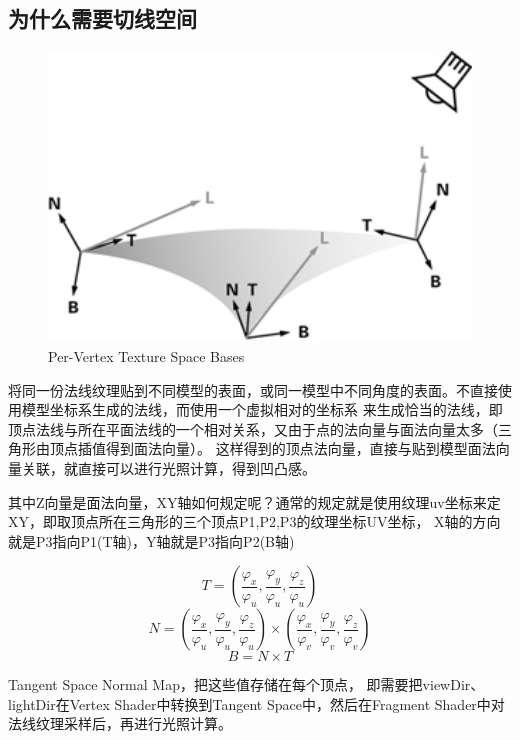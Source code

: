 \subsection{ 为什么需要切线空间 }

\begin{figure}[h]
    \centering
    \includegraphics[width=1\textwidth]{images/vertex-texture-space-bases.jpg}
    \caption{Per-Vertex Texture Space Bases}    
\end{figure}

将同一份法线纹理贴到不同模型的表面，或同一模型中不同角度的表面。不直接使用模型坐标系生成的法线，而使用一个虚拟相对的坐标系
来生成恰当的法线，即顶点法线与所在平面法线的一个相对关系，又由于点的法向量与面法向量太多（三角形由顶点插值得到面法向量）。
这样得到的顶点法向量，直接与贴到模型面法向量关联，就直接可以进行光照计算，得到凹凸感。

其中Z向量是面法向量，XY轴如何规定呢？通常的规定就是使用纹理uv坐标来定XY，即取顶点所在三角形的三个顶点P1,P2,P3的纹理坐标UV坐标，
X轴的方向就是P3指向P1(T轴)，Y轴就是P3指向P2(B轴)

$$
T = (\frac{\varphi_{x}}{\varphi_{u}}, \frac{\varphi_{y}}{\varphi_{u}}, \frac{\varphi_{z}}{\varphi_{u}})
$$
$$
N = (\frac{\varphi_{x}}{\varphi_{u}}, \frac{\varphi_{y}}{\varphi_{u}}, \frac{\varphi_{z}}{\varphi_{u}}) \times (\frac{\varphi_{x}}{\varphi_{v}}, \frac{\varphi_{y}}{\varphi_{v}}, \frac{\varphi_{z}}{\varphi_{v}})
$$
$$
B = N \times T
$$

Tangent Space Normal Map\cite{TangentSpaceNormalMapping}，把这些值存储在每个顶点，
即需要把viewDir、lightDir在Vertex Shader中转换到Tangent Space中，然后在Fragment Shader中对法线纹理采样后，再进行光照计算。

